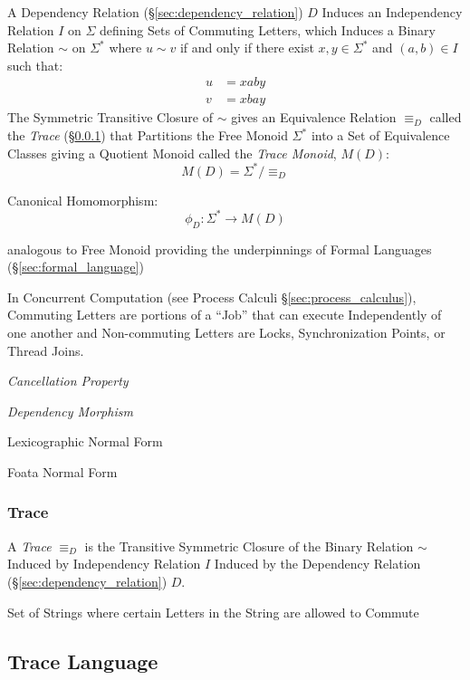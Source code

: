 A Dependency Relation (\S\ref{sec:dependency_relation}) $D$ Induces an
Independency Relation $I$ on $\Sigma$ defining Sets of Commuting
Letters, which Induces a Binary Relation $\sim$ on $\Sigma^*$ where $u
\sim v$ if and only if there exist $x,y \in \Sigma^*$ and $(a,b) \in
I$ such that:
\begin{align*}
  u &= xaby \\
  v &= xbay
\end{align*}
The Symmetric Transitive Closure of $\sim$ gives an Equivalence
Relation $\equiv_D$ called the \emph{Trace} (\S\ref{sec:trace}) that
Partitions the Free Monoid $\Sigma^*$ into a Set of Equivalence
Classes giving a Quotient Monoid called the \emph{Trace Monoid},
$M(D)$:
\[
  M(D) = \Sigma^*/\equiv_D
\]

Canonical Homomorphism:
\[
  \phi_D : \Sigma^* \rightarrow M(D)
\]

analogous to Free Monoid providing the underpinnings of Formal
Languages (\S\ref{sec:formal_language})

In Concurrent Computation (see Process Calculi
\S\ref{sec:process_calculus}), Commuting Letters are portions of a
``Job'' that can execute Independently of one another and
Non-commuting Letters are Locks, Synchronization Points, or Thread
Joins. %

\emph{Cancellation Property}

\emph{Dependency Morphism}

Lexicographic Normal Form

Foata Normal Form



\subsubsection{Trace}\label{sec:trace}

A \emph{Trace} $\equiv_D$ is the Transitive Symmetric Closure of the
Binary Relation $\sim$ Induced by Independency Relation $I$ Induced by
the Dependency Relation (\S\ref{sec:dependency_relation}) $D$.

Set of Strings where certain Letters in the String are allowed to
Commute



\subsection{Trace Language}\label{sec:trace_language}

